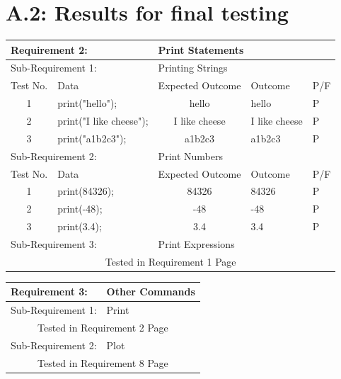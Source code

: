 \documentclass[a4paper, oneside, 11pt]{report}
\begin{document}
\section{A.2: Results for final testing}
\newpage
\begin{table}
\label{tab:req2}
\begin{tabular}{clcll}
\hline
\multicolumn{2}{l}{Requirement 2:}             & \multicolumn{3}{l}{Print Statements} \\ \hline
\multicolumn{2}{l}{Sub-Requirement 1:}         & \multicolumn{3}{l}{Printing Strings}              \\
\multicolumn{1}{l}{Test No.} & Data            & \multicolumn{1}{l}{Expected Outcome}  & Outcome & P/F \\
1                            & print("hello");      & hello                            &  hello       & P    \\
2                            & print("I like cheese");  & I like cheese                 &  I like cheese       & P     \\
3                            & print("a1b2c3");  & a1b2c3                           &   a1b2c3      & P    \\
\multicolumn{2}{l}{Sub-Requirement 2:}         & \multicolumn{3}{l}{Print Numbers}           \\
\multicolumn{1}{l}{Test No.} & Data            & \multicolumn{1}{l}{Expected Outcome}  & Outcome & P/F \\
1                            & print(84326);     & 84326                            &  84326       & P     \\
2                            & print(-48);   & -48                                  &    -48     & P    \\
3                            & print(3.4); & 3.4                                  &     3.4    & P     \\
\multicolumn{2}{l}{Sub-Requirement 3:}         & \multicolumn{3}{l}{Print Expressions}        \\
\multicolumn{5}{c}{Tested in Requirement 1 Page \pageref{tab:req1}} 
\end{tabular}
\end{table}

\begin{table}
\label{tab:req3}
\begin{tabular}{clcll}
\hline
\multicolumn{2}{l}{Requirement 3:}             & \multicolumn{3}{l}{Other Commands} \\ \hline
\multicolumn{2}{l}{Sub-Requirement 1:}         & \multicolumn{3}{l}{Print}              \\
\multicolumn{5}{c}{Tested in Requirement 2 Page \pageref{tab:req2}} \\
\multicolumn{2}{l}{Sub-Requirement 2:}         & \multicolumn{3}{l}{Plot}           \\
\multicolumn{5}{c}{Tested in Requirement 8 Page \pageref{tab:req8}} \\
\end{tabular}
\end{table}
\end{document}

